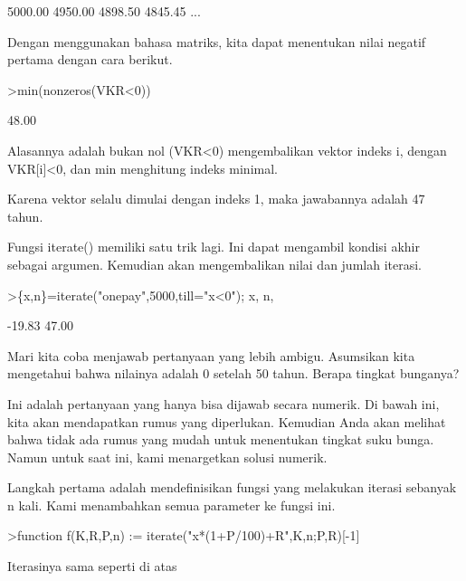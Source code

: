 \documentclass{article}
\begin{document}
\begin{eulernotebook}
\begin{eulercomment}
\begin{eulercomment}
\begin{eulercomment}
\begin{eulercomment}
\begin{eulercomment}
\begin{eulercomment}
\begin{eulercomment}
\begin{eulercomment}
\begin{eulercomment}
\begin{eulercomment}
\begin{euleroutput}
      5000.00     4950.00     4898.50     4845.45     ...
\end{euleroutput}
\begin{eulercomment}
Dengan menggunakan bahasa matriks, kita dapat menentukan nilai negatif
pertama dengan cara berikut.
\end{eulercomment}
\begin{eulerprompt}
>min(nonzeros(VKR<0))
\end{eulerprompt}
\begin{euleroutput}
        48.00 
\end{euleroutput}
\begin{eulercomment}
Alasannya adalah bukan nol (VKR\textless{}0) mengembalikan vektor indeks i,
dengan VKR[i]\textless{}0, dan min menghitung indeks minimal.

Karena vektor selalu dimulai dengan indeks 1, maka jawabannya adalah
47 tahun.

Fungsi iterate() memiliki satu trik lagi. Ini dapat mengambil kondisi
akhir sebagai argumen. Kemudian akan mengembalikan nilai dan jumlah
iterasi.
\end{eulercomment}
\begin{eulerprompt}
>\{x,n\}=iterate("onepay",5000,till="x<0"); x, n,
\end{eulerprompt}
\begin{euleroutput}
       -19.83 
        47.00 
\end{euleroutput}
\begin{eulercomment}
Mari kita coba menjawab pertanyaan yang lebih ambigu. Asumsikan kita
mengetahui bahwa nilainya adalah 0 setelah 50 tahun. Berapa tingkat
bunganya?

Ini adalah pertanyaan yang hanya bisa dijawab secara numerik. Di bawah
ini, kita akan mendapatkan rumus yang diperlukan. Kemudian Anda akan
melihat bahwa tidak ada rumus yang mudah untuk menentukan tingkat suku
bunga. Namun untuk saat ini, kami menargetkan solusi numerik.

Langkah pertama adalah mendefinisikan fungsi yang melakukan iterasi
sebanyak n kali. Kami menambahkan semua parameter ke fungsi ini.
\end{eulercomment}
\begin{eulerprompt}
>function f(K,R,P,n) := iterate("x*(1+P/100)+R",K,n;P,R)[-1]
\end{eulerprompt}
\begin{eulercomment}
Iterasinya sama seperti di atas


\end{eulercomment}
\end{eulercomment}
\end{eulercomment}
\end{eulercomment}
\end{eulercomment}
\end{eulercomment}
\end{eulercomment}
\end{eulercomment}
\end{eulercomment}
\end{eulercomment}
\end{eulercomment}
\end{eulernotebook}
\end{document}
